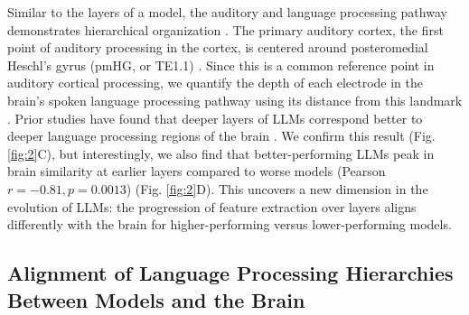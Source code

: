 Similar to the layers of a model, the auditory and language processing pathway demonstrates hierarchical organization \cite{hickok2007cortical, sharpee2011hierarchical, hasson2008hierarchy, lerner2011topographic}. The primary auditory cortex, the first point of auditory processing in the cortex, is centered around posteromedial Heschl’s gyrus (pmHG, or TE1.1) \cite{morosan2001human}. Since this is a common reference point in auditory cortical processing, we quantify the depth of each electrode in the brain’s spoken language processing pathway using its distance from this landmark \cite{baumann2013unified, norman2018neural, mischler2023deep}. Prior studies have found that deeper layers of LLMs correspond better to deeper language processing regions of the brain \cite{caucheteux2022brains, caucheteux2023evidence, kumar2022reconstructing}. We confirm this result (Fig. \ref{fig:2}C), but interestingly, we also find that better-performing LLMs peak in brain similarity at earlier layers compared to worse models (Pearson $r=-0.81, p=0.0013$) (Fig. \ref{fig:2}D). This uncovers a new dimension in the evolution of LLMs: the progression of feature extraction over layers aligns differently with the brain for higher-performing versus lower-performing models.


\subsection{Alignment of Language Processing Hierarchies Between Models and the Brain}

